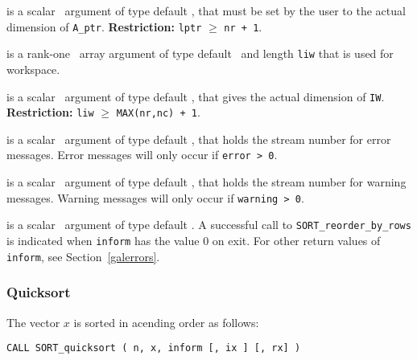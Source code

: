 \documentclass{galahad}
\newcommand{\packagename}{SORT}
\begin{document}
\begin{description}
 is a scalar \intentin\ argument of type default
\integer, that must be set by the user to the 
actual dimension of {\tt A\_ptr}.
{\bf Restriction:} {\tt lptr} $\geq$ {\tt nr + 1}.

  is a rank-one \intentout\ array argument of type default 
\integer\ and length {\tt liw} that is used for workspace.

  is a scalar \intentin\ argument of type default 
\integer, that gives the actual dimension of {\tt IW}.
{\bf Restriction:} {\tt liw} $\geq$ {\tt MAX(nr,nc) + 1}.

 is a scalar \intentin\ argument of type default 
\integer, that holds the stream number for error messages.
Error messages will only occur if {\tt error > 0}.

 is a scalar \intentin\ argument of type default 
\integer, that holds the stream number for warning messages.
Warning messages will only occur if {\tt warning > 0}.

 is a scalar \intentout\ argument of type default \integer.
A successful call to {\tt \packagename\_reorder\_by\_rows}
is indicated when {\tt inform} has the value 0 on exit.
For other return values of {\tt inform}, see Section~\ref{galerrors}.

\end{description}

\subsubsection{Quicksort}

The vector $x$ is sorted in acending order as follows:
\vspace*{1mm}

\hspace{8mm}
{\tt CALL \packagename\_quicksort ( n, x, inform [, ix ] [, rx] )}
\end{document}
